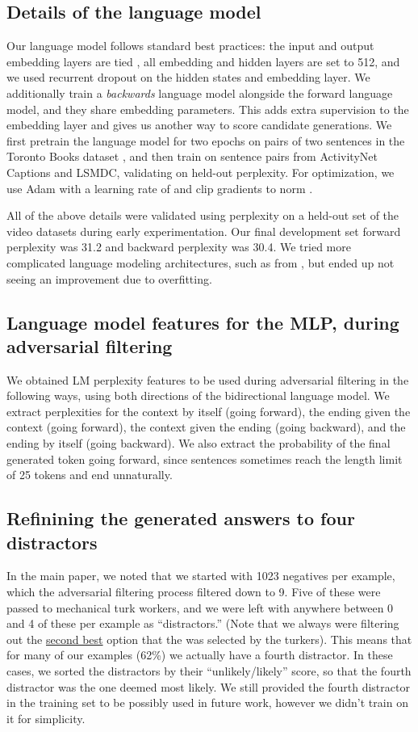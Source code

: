 \documentclass[11pt,a4paper]{article}
\begin{document}
\subsection{Details of the language model}
 Our language model follows standard best practices: the input and output embedding layers are tied \citep{inan2016tying, press2017using}, all embedding and hidden layers are set to 512, and we used recurrent dropout \cite{gal2016theoretically} on the hidden states and embedding layer. We additionally train a \emph{backwards} language model alongside the forward language model, and they share embedding parameters. This adds extra supervision to the embedding layer and gives us another way to score candidate generations. We first pretrain the language model for two epochs on pairs of two sentences in the Toronto Books dataset \cite{moviebook}, and then train on sentence pairs from ActivityNet Captions and LSMDC, validating on held-out perplexity. For optimization, we use Adam \cite{Kingma2014AdamAM} with a learning rate of  and clip gradients to norm . 
 
 All of the above details were validated using perplexity on a held-out set of the video datasets during early experimentation. Our final development set forward perplexity was 31.2 and backward perplexity was 30.4. We tried more complicated language modeling architectures, such as from \cite{Jzefowicz2016ExploringTL}, but ended up not seeing an improvement due to overfitting.

\subsection{Language model features for the MLP, during adversarial filtering}
We obtained LM perplexity features to be used during adversarial filtering in the following ways, using both directions of the bidirectional language model. We extract perplexities for the context by itself (going forward), the ending given the context (going forward), the context given the ending (going backward), and the ending by itself (going backward). We also extract the probability of the final generated token going forward, since sentences sometimes reach the length limit of 25 tokens and end unnaturally.

\subsection{Refinining the generated answers to four distractors}
In the main paper, we noted that we started with 1023 negatives per example, which the adversarial filtering process filtered down to 9. Five of these were passed to mechanical turk workers, and we were left with anywhere between 0 and 4 of these per example as ``distractors.'' (Note that we always were filtering out the \underline{second best} option that the was selected by the turkers). This means that for many of our examples (62\%) we actually have a fourth distractor. In these cases, we sorted the distractors by their ``unlikely/likely'' score, so that the fourth distractor was the one deemed most likely. We still provided the fourth distractor in the training set to be possibly used in future work, however we didn't train on it for simplicity.
\end{document}
